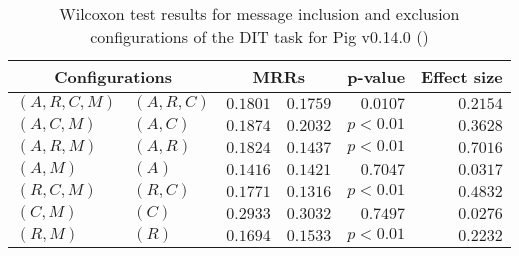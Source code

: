 
\begin{table}
\begin{spacing}{1.2}
\centering
\caption{Wilcoxon test results for message inclusion and exclusion configurations of the DIT task for Pig v0.14.0 (\ctwo)}
\label{table:versus-wilcox-pig-dit-message}
\begin{tabular}{ll|rr|rr}
\toprule
      \multicolumn{2}{c|}{Configurations} &                \multicolumn{2}{c|}{MRRs} &             p-value & Effect size \\
\midrule
 $(A,R,C,M)$ &  $(A,R,C)$ &  $\bm{0.1801}$ &       $0.1759$ & $0.0107$ &    $0.2154$ \\
   $(A,C,M)$ &    $(A,C)$ &       $0.1874$ &  $\bm{0.2032}$ & $p<0.01$ &    $0.3628$ \\
   $(A,R,M)$ &    $(A,R)$ &  $\bm{0.1824}$ &       $0.1437$ & $p<0.01$ &    $0.7016$ \\
     $(A,M)$ &      $(A)$ &       $0.1416$ &  $\bm{0.1421}$ & $0.7047$ &    $0.0317$ \\
   $(R,C,M)$ &    $(R,C)$ &  $\bm{0.1771}$ &       $0.1316$ & $p<0.01$ &    $0.4832$ \\
     $(C,M)$ &      $(C)$ &       $0.2933$ &  $\bm{0.3032}$ & $0.7497$ &    $0.0276$ \\
     $(R,M)$ &      $(R)$ &  $\bm{0.1694}$ &       $0.1533$ & $p<0.01$ &    $0.2232$ \\
\bottomrule
\end{tabular}

\end{spacing}
\end{table}

